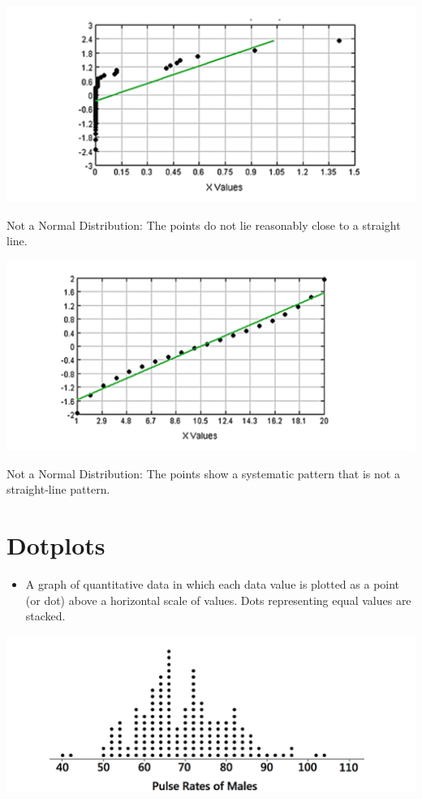 \documentclass[]{book}
\providecommand{\tightlist}{%
  \setlength{\itemsep}{0pt}\setlength{\parskip}{0pt}}
\begin{document}
\includegraphics{not_normal_QQ_1.png}

Not a Normal Distribution: The points do not lie reasonably close to a straight line.

\includegraphics{not_normal_QQ_2.png}

Not a Normal Distribution: The points show a systematic pattern that is not a straight-line pattern.

\hypertarget{dotplots}{%
\section{Dotplots}\label{dotplots}}

\begin{itemize}
\tightlist
\item
  A graph of quantitative data in which each data value is plotted as a point (or dot) above a horizontal scale of values. Dots representing equal values are stacked.
\end{itemize}

\includegraphics{dot.png}
\end{document}
